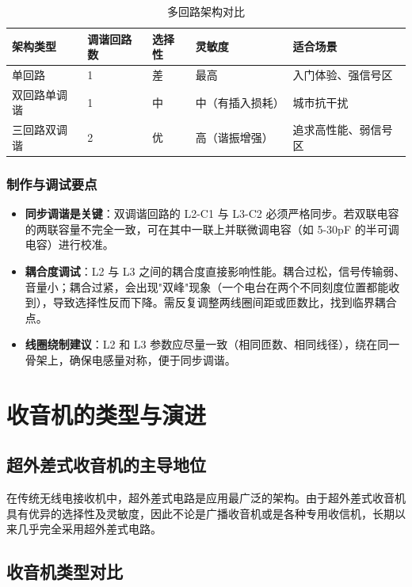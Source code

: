\documentclass[12pt,UTF8]{ctexbook}
\begin{document}
\begin{table}[H]
	\centering
	\begin{tabular}{|l|l|l|l|l|}
		\hline
		架构类型 & 调谐回路数 & 选择性 & 灵敏度 & 适合场景 \\
		\hline
		单回路 & 1 & 差 & 最高 & 入门体验、强信号区 \\
		\hline
		双回路单调谐 & 1 & 中 & 中（有插入损耗） & 城市抗干扰 \\
		\hline
		三回路双调谐 & 2 & 优 & 高（谐振增强） & 追求高性能、弱信号区 \\
		\hline
	\end{tabular}
	\caption{多回路架构对比}
	\label{tab:multi-loop-comparison}
\end{table}

\subsection{制作与调试要点}

\begin{itemize}[leftmargin=2cm]
	\item \textbf{同步调谐是关键}：双调谐回路的 L2-C1 与 L3-C2 必须严格同步。若双联电容的两联容量不完全一致，可在其中一联上并联微调电容（如 5-30pF 的半可调电容）进行校准。
	\item \textbf{耦合度调试}：L2 与 L3 之间的耦合度直接影响性能。耦合过松，信号传输弱、音量小；耦合过紧，会出现"双峰"现象（一个电台在两个不同刻度位置都能收到），导致选择性反而下降。需反复调整两线圈间距或匝数比，找到临界耦合点。
	\item \textbf{线圈绕制建议}：L2 和 L3 参数应尽量一致（相同匝数、相同线径），绕在同一骨架上，确保电感量对称，便于同步调谐。
\end{itemize}


\chapter{收音机的类型与演进}

\section{超外差式收音机的主导地位}

在传统无线电接收机中，超外差式电路是应用最广泛的架构。由于超外差式收音机具有优异的选择性及灵敏度，因此不论是广播收音机或是各种专用收信机，长期以来几乎完全采用超外差式电路。

\section{收音机类型对比}
\end{document}
